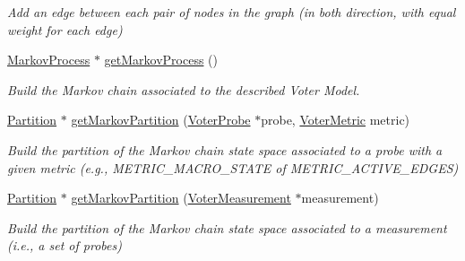 \begin{DoxyCompactItemize}
\begin{DoxyCompactList}\small\item\em Add an edge between each pair of nodes in the graph (in both direction, with equal weight for each edge) \end{DoxyCompactList}\item 
\hyperlink{class_markov_process}{Markov\+Process} $\ast$ \hyperlink{class_voter_graph_acc86929339ec0a0ce2946146919b1eb7}{get\+Markov\+Process} ()
\begin{DoxyCompactList}\small\item\em Build the Markov chain associated to the described Voter Model. \end{DoxyCompactList}\item 
\hyperlink{class_partition}{Partition} $\ast$ \hyperlink{class_voter_graph_a04231db4297c6a1d4232c5403b202d71}{get\+Markov\+Partition} (\hyperlink{class_voter_probe}{Voter\+Probe} $\ast$probe, \hyperlink{voter__graph_8hpp_acb4c45a5ce4a55eee28e54e60409b9c5}{Voter\+Metric} metric)
\begin{DoxyCompactList}\small\item\em Build the partition of the Markov chain state space associated to a probe with a given metric (e.\+g., M\+E\+T\+R\+I\+C\+\_\+\+M\+A\+C\+R\+O\+\_\+\+S\+T\+A\+T\+E of M\+E\+T\+R\+I\+C\+\_\+\+A\+C\+T\+I\+V\+E\+\_\+\+E\+D\+G\+E\+S) \end{DoxyCompactList}\item 
\hyperlink{class_partition}{Partition} $\ast$ \hyperlink{class_voter_graph_a2c0a299c1249cc04e011d0f507467007}{get\+Markov\+Partition} (\hyperlink{class_voter_measurement}{Voter\+Measurement} $\ast$measurement)
\begin{DoxyCompactList}\small\item\em Build the partition of the Markov chain state space associated to a measurement (i.\+e., a set of probes) \end{DoxyCompactList}\end{DoxyCompactItemize}
